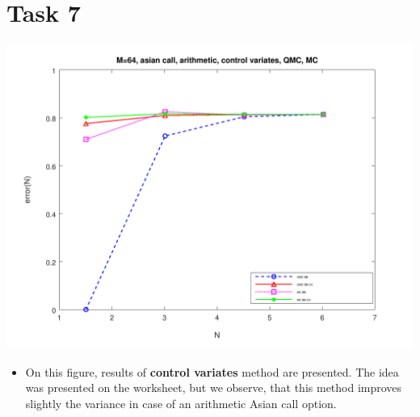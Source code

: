 \documentclass[10pt,a4paper]{article}
\begin{document}
\section*{Task 7}


\begin{center}
	\includegraphics[scale=0.35]{images/task7.png}
\end{center}
\begin{itemize}
    \item{
        On this figure, results of \textbf{control variates}
        method are presented. The idea was presented on the worksheet, but we observe, that this method improves slightly the variance in case of an arithmetic Asian call option. 
    }
\end{itemize}
\end{document}
